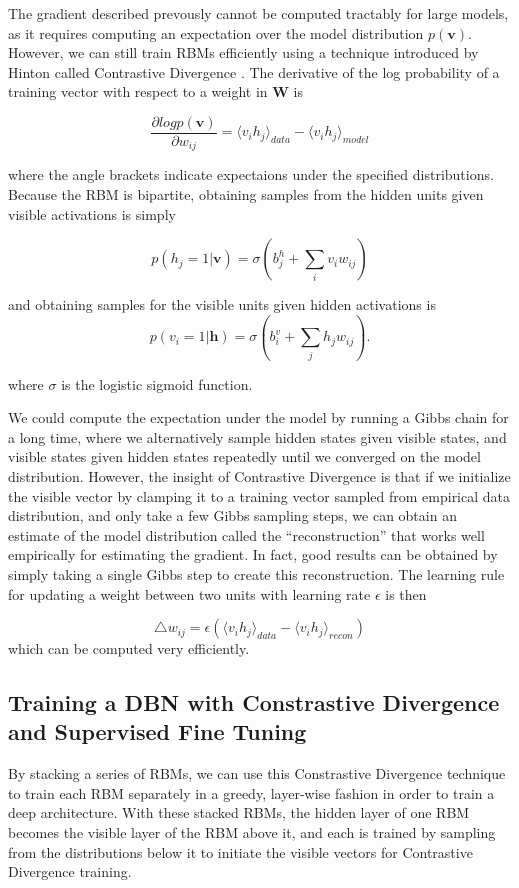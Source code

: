 \documentclass{article}
\begin{document}
The gradient described prevously cannot be computed tractably for large models,
as it requires computing an expectation over the model distribution
$p(\mathbf{v})$.  However, we can still train RBMs efficiently using a
technique introduced by Hinton called Contrastive Divergence
\cite{hinton_contrastivedivergence}. The derivative of the log probability of a
training vector with respect to a weight in $\mathbf{W}$ is 

\[
  \frac{\partial log p(\mathbf{v})}{\partial w_{ij}} = 
  \langle v_i h_j \rangle_{data} - \langle v_i h_j \rangle_{model}
\]

where the angle brackets indicate expectaions under the specified distributions.
Because the RBM is bipartite, obtaining samples from the hidden units given
visible activations is simply

\[
  p (h_j = 1 | \mathbf{v}) = \sigma(b_{j}^{h} + \sum_i v_{i} w_{ij})
\]

and obtaining samples for the visible units given hidden activations is
\[
  p (v_i = 1 | \mathbf{h}) = \sigma(b_{i}^{v} + \sum_j h_j w_{ij}).
\]

where $\sigma$ is the logistic sigmoid function.

We could compute the expectation under the model by running a Gibbs chain for a
long time, where we alternatively sample hidden states given visible states,
and visible states given hidden states repeatedly until we converged on the
model distribution. However, the insight of Contrastive Divergence is that if
we initialize the visible vector by clamping it to a training vector sampled
from empirical data distribution, and only take a few Gibbs sampling steps, we
can obtain an estimate of the model distribution called the ``reconstruction''
that works well empirically for estimating the gradient. In fact, good results
can be obtained by simply taking a single Gibbs step to create this
reconstruction. The learning rule for updating a weight between two units
with learning rate $\epsilon$ is then

\[
  \triangle w_{ij} = \epsilon( 
  \langle v_i h_j \rangle_{data} - \langle v_i h_j \rangle_{recon}
  )
\]
which can be computed very efficiently.

\subsection{Training a DBN with Constrastive Divergence and Supervised Fine Tuning}

By stacking a series of RBMs, we can use this Constrastive Divergence technique
to train each RBM separately in a greedy, layer-wise fashion in order to train
a deep architecture. With these stacked RBMs, the hidden layer of one RBM
becomes the visible layer of the RBM above it, and each is trained by sampling
from the distributions below it to initiate the visible vectors for
Contrastive Divergence training.
\end{document}
